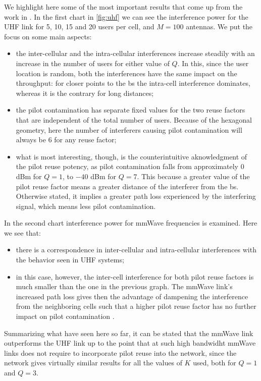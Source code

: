 \documentclass[11pt]{book}
\begin{document}
We highlight here some of the most important results that come up from the work in \cite{Ahsan2016}. In the first chart in \autoref{fig:uhf} we can see the interference power for the UHF link for 5, 10, 15 and 20 users per cell, and $M = 100$ antennas. We put the focus on some main aspects:
\begin{itemize}
  \item the inter-cellular and the intra-cellular interferences
  increase steadily with an increase in the number of users for
  either value of $Q$. In this, since the user location is random, both the interferences have the same impact on the throughput: for closer points to the \gls{bs} the intra-cell interference dominates, whereas it is the contrary for long distances;
  \item the pilot contamination has separate fixed values for the
  two reuse factors that are independent of the total number of users. Because of the hexagonal geometry, here the number of interferers causing pilot contamination will always be $6$ for any reuse factor;
  \item what is most interesting, though, is the counterintuitive aknowledgment of the pilot reuse potency, as pilot contamination falls from approximately $0$ dBm for $Q=1$, to $-40$ dBm for $Q=7$. This because a greater value of the pilot reuse factor means a greater distance of the interferer from the \gls{bs}. Otherwise stated, it implies a greater path loss experienced by the interfering signal, which means less pilot contamination.
\end{itemize}
In the second chart interference power for mmWave frequencies is examined. Here we see that:
\begin{itemize}
  \item there is a correspondence in inter-cellular and intra-cellular interferences with the behavior seen in UHF systems;
  \item in this case, however, the inter-cell interference for both pilot reuse factors is much smaller than the one in the previous graph. The mmWave link’s increased path loss gives then the advantage of dampening the interference from the neighboring cells such that a higher pilot reuse factor has no further impact on pilot contamination \cite{Ahsan2016}.
\end{itemize}

Summarizing what have seen here so far, it can be stated that the mmWave link outperforms the UHF link up to the point that at such high bandwidht mmWave links does not require to incorporate pilot reuse into the network, since the network gives virtually similar results for all the values of $K$ used, both for $Q = 1$ and $Q=3$.
\end{document}
